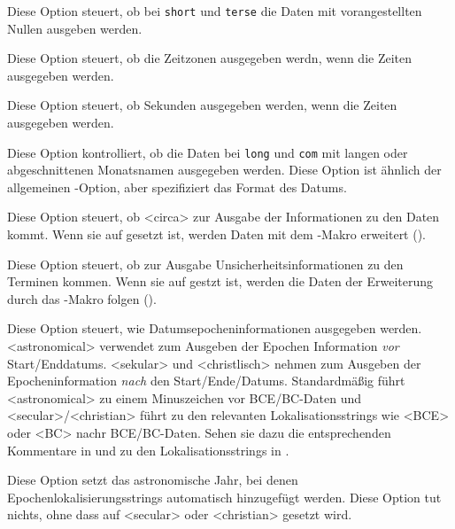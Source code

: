 \documentclass{ltxdockit}[2011/03/25]
\begin{document}
\begin{optionlist}

Diese Option steuert, ob bei \texttt{short} und \texttt{terse} die Daten
mit vorangestellten Nullen ausgeben werden.


Diese Option steuert, ob die Zeitzonen ausgegeben werdn, wenn die Zeiten ausgegeben werden.


Diese Option steuert, ob Sekunden ausgegeben werden, wenn die Zeiten ausgegeben werden.


 Diese Option kontrolliert, ob die Daten bei \texttt{long} und \texttt{com} mit
 langen oder abgeschnittenen Monatsnamen ausgegeben werden. Diese Option ist
 ähnlich der allgemeinen -Option, aber spezifiziert das Format
 des Datums.


Diese Option steuert, ob <circa> zur Ausgabe der Informationen zu den Daten kommt.
Wenn sie auf  gesetzt ist, werden Daten mit dem -Makro 
erweitert ().


Diese Option steuert, ob zur Ausgabe Unsicherheitsinformationen zu den Terminen 
kommen. Wenn sie auf  gestzt ist, werden die Daten der Erweiterung
durch das -Makro folgen ().


Diese Option steuert, wie Datumsepocheninformationen ausgegeben werden. 
<astronomical> verwendet  zum Ausgeben der Epochen Information \emph{vor} Start/Enddatums. <sekular> und <christlisch> nehmen  
zum Ausgeben der Epocheninformation \emph{nach} den Start/Ende/Datums. Standardmäßig  führt <astronomical> zu einem Minuszeichen vor BCE/BC-Daten und <secular>/<christian> führt zu den relevanten Lokalisationsstrings wie <BCE> oder <BC> nachr BCE/BC-Daten. 
Sehen sie dazu die entsprechenden Kommentare in  und 
zu den Lokalisationsstrings in .


Diese Option setzt das astronomische Jahr, bei denen Epochenlokalisierungsstrings
automatisch hinzugefügt werden. Diese Option tut nichts, ohne dass  auf <secular> oder <christian> gesetzt wird.


\end{optionlist}
\end{document}
